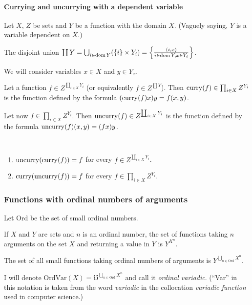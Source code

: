 \paragraph{Currying and uncurrying with a dependent variable}

Let $X$, $Z$ be sets and $Y$ be a function with the domain $X$.
(Vaguely saying, $Y$ is a variable dependent on $X$.)

The disjoint union $\coprod Y=\bigcup_{i\in\operatorname{dom} Y}(\{i\}\times Y_{i})=\left\{ \frac{(i,x)}{i\in\operatorname{dom} Y,x\in Y_{i}}\right\}$.

We will consider variables $x\in X$ and $y\in Y_{x}$.

Let a function $f\in Z^{\coprod_{i\in X}Y_{i}}$
(or equivalently $f\in Z^{\coprod Y}$). Then $\operatorname{curry}(f)\in\prod_{i\in X}Z^{Y_{i}}$
is the function defined by the formula $(\operatorname{curry}(f)x)y=f(x,y)$.

Let now $f\in\prod_{i\in X}Z^{Y_{i}}$. Then $\operatorname{uncurry}(f)\in Z^{\coprod_{i\in X}Y_{i}}$
is the function defined by the formula $\operatorname{uncurry}(f)(x,y)=(fx)y$.
\begin{obvious}
~
\begin{enumerate}
\item $\operatorname{uncurry}(\operatorname{curry}(f))=f$ for every $f\in Z^{\coprod_{i\in X}Y_{i}}$.
\item $\operatorname{curry}(\operatorname{uncurry}(f))=f$ for every $f\in\prod_{i\in X}Z^{Y_{i}}$.
\end{enumerate}
\end{obvious}

\subsubsection{Functions with ordinal numbers of arguments}

Let $\mathrm{Ord}$ be the set of small ordinal numbers.

If $X$ and $Y$ are sets and $n$ is an ordinal number, the set of
functions taking $n$ arguments on the set $X$ and returning a value
in $Y$ is $Y^{X^{n}}$.

The set of all small functions taking ordinal numbers of arguments
is $Y^{\bigcup_{n\in\mathrm{Ord}}X^{n}}$.

I will denote $\mathrm{OrdVar}(X)=\mho^{\bigcup_{n\in\mathrm{Ord}}X^{n}}$
and call it \emph{ordinal variadic}. (``Var'' in this notation is
taken from the word \emph{variadic} in the collocation \emph{variadic
function} used in computer science.)


